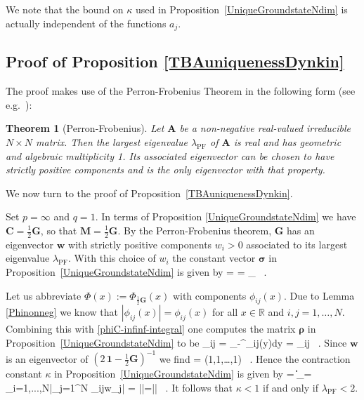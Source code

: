 \documentclass[12pt]{article}
\theoremstyle{plain}
\newtheorem{theorem}{Theorem}
\theoremstyle{definition}
\numberwithin{equation}{section}
\numberwithin{theorem}{section}
\def\be#1\ee{\begin{equation}#1\end{equation}}
\renewcommand{\vec}[1]{\mathbf{#1}}
\begin{document}
We note that the bound on $\kappa$ used in Proposition~\ref{UniqueGroundstateNdim} is actually independent of the functions $a_j$.


\subsection{Proof of Proposition \ref{TBAuniquenessDynkin}}\label{uniqunessproofTBA}

The proof makes use of the Perron-Frobenius Theorem in the following form 
(see e.g.~\cite[Theorem 2.2.1]{BrouwerHaemers}):

\begin{theorem}[Perron-Frobenius]\label{PF}
Let $\vec{A}$ be a non-negative real-valued irreducible $N\times N$ matrix. Then the largest eigenvalue $\lambda_{\mathrm{PF}}$ of $\vec{A}$ is real and has geometric and algebraic multiplicity 1. Its associated eigenvector can be chosen to have strictly positive components
and is the only eigenvector with that property.
\end{theorem}

\medskip

We now turn to the proof of Proposition~\ref{TBAuniquenessDynkin}.

\medskip

Set $p=\infty$ and $q=1$. In terms of Proposition \ref{UniqueGroundstateNdim} we have $\vec{C}=\frac{1}{2}\vec{G}$, so that
$\vec{M}=\frac{1}{2}\vec{G}$. 
By the Perron-Frobenius theorem, $\vec{G}$ has an eigenvector $\vec{w}$ with strictly positive components $w_i>0$ associated to its largest eigenvalue $\lambda_{\mathrm{PF}}$. With this choice of $w_i$ the constant 
vector $\boldsymbol{\sigma}$ in 
Proposition~\ref{UniqueGroundstateNdim}
is given by
\be\label{sig}
\boldsymbol\sigma 
=  \vec{G}\vec{w}
=  \lambda_{} \vec{w} \ .
\ee

Let us abbreviate $\Phi(x) := \Phi_{\frac{1}{2}\vec G}(x)$ with components $\phi_{ij}(x)$. 
Due to Lemma \ref{Phinonneg} we know that
$|\phi_{ij}(x)|=\phi_{ij}(x)$ 
for all $x\in\mathbb{R}$ and $i,j=1,\dots,N$. Combining this with \eqref{phiC-infinf-integral} one computes the matrix $\boldsymbol{\rho}$ in 
Proposition~\ref{UniqueGroundstateNdim} to be
\be
\rho_{ij} =  \int_{-\infty}^\infty\phi_{ij}(y)dy 
= 
\big[ (2\,\mathbf{1} - \tfrac{1}{2}\vec{G})^{-1}\big]_{ij} \ .
\ee
Since $\vec{w}$ is an eigenvector of $(2\,\mathbf{1} - \tfrac{1}{2}\vec{G})^{-1}$ we find
\be\label{rhow}
\boldsymbol\rho \cdot \vec{w} =  \cdot (1,1,\dots,1) \ .
\ee
Hence the contraction constant $\kappa$ in 
Proposition~\ref{UniqueGroundstateNdim} is given by
\be\kappa = \left\|\boldsymbol\rho\cdot\boldsymbol\sigma\right\|_\infty  = \max_{i=1,...,N}\left|\sum_{j=1}^N \rho_{ij}w_j\right| = \left|\right|=\left|\right| \ .
\ee
It follows that $\kappa<1$ if and only if $\lambda_{\mathrm{PF}}<2$.
\end{document}
